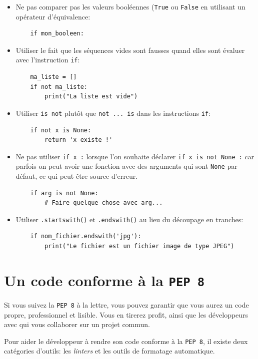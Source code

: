 \documentclass[a4paper,11pt]{book}
\begin{document}
\begin{itemize}
	\item Ne  pas comparer pas les valeurs booléennes  (\texttt{True} ou \texttt{False} en utilisant un opérateur d'équivalence:
	\begin{lstlisting}
	if mon_booleen:
	\end{lstlisting}
	\item Utiliser le fait que les séquences vides sont fausses quand elles sont évaluer avec l'instruction \texttt{if}:
	\begin{lstlisting}
	ma_liste = []
	if not ma_liste:
	    print("La liste est vide")
	\end{lstlisting}
	\item Utiliser \texttt{is not} plutôt que \texttt{not ... is} dans les instructions \texttt{if}:
	\begin{lstlisting}
	if not x is None:
	    return 'x existe !'
	\end{lstlisting}
    \item Ne pas utiliser \texttt{if x :} lorsque l'on souhaite déclarer \texttt{if x is not None :} car parfois on peut avoir une fonction avec des arguments qui sont \texttt{None} par défaut, ce qui peut être source d'erreur.
    \begin{lstlisting}
    if arg is not None:
        # Faire quelque chose avec arg...
    \end{lstlisting}
    \item Utiliser \texttt{.startswith()} et \texttt{.endswith()} au lieu du découpage en tranches:
    \begin{lstlisting}
    if nom_fichier.endswith('jpg'):
        print("Le fichier est un fichier image de type JPEG")
    \end{lstlisting}
\end{itemize}
\medskip

\section{Un code conforme à la \texttt{PEP 8}}
Si vous suivez la \texttt{PEP 8} à la lettre, vous pouvez garantir que vous aurez un code propre, professionnel et lisible. Vous en tirerez profit, ainsi que les développeurs avec qui vous collaborer sur un projet commun.
\medskip

Pour aider le développeur à rendre son code conforme à la \texttt{PEP 8}, il existe deux catégories d'outils: les \textit{linters} et les outils de formatage automatique.
\medskip
\end{document}
